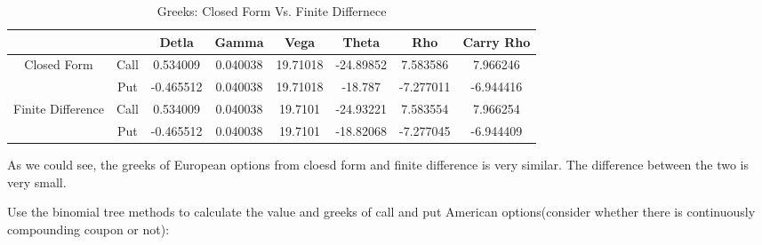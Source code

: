 \documentclass[11pt,en]{elegantpaper}
\begin{document}
\begin{table}[htbp]
    \centering
    \caption{Greeks: Closed Form Vs. Finite Differnece}
    \begin{tabular}{@{}cccccccc@{}}
        \toprule
        \textbf{} &  & \textbf{Detla} & \textbf{Gamma} & \textbf{Vega} & \textbf{Theta} & \textbf{Rho} & \textbf{Carry Rho} \\
        \midrule
        Closed Form & Call & 0.534009 & 0.040038 & 19.71018 & -24.89852 & 7.583586 & 7.966246 \\
        & Put & -0.465512 & 0.040038 & 19.71018 & -18.787 & -7.277011 & -6.944416 \\
       Finite Difference & Call & 0.534009 & 0.040038 & 19.7101 & -24.93221 & 7.583554 & 7.966254 \\
        & Put & -0.465512 & 0.040038 & 19.7101 & -18.82068 & -7.277045 & -6.944409\\
        \bottomrule
    \end{tabular}
\end{table}

\newpage

As we could see, the greeks of European options from cloesd form and finite difference is very similar. The difference between the two is very small. 

Use the binomial tree methods to calculate the value and greeks of call and put American options(consider whether there is continuously compounding coupon or not):
\end{document}
